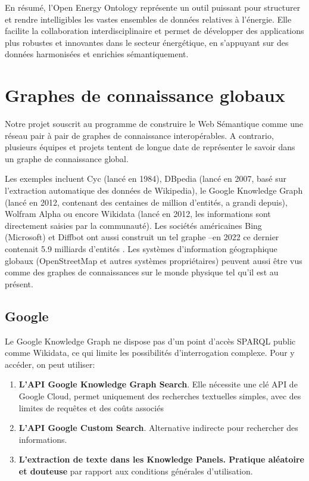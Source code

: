\documentclass[a4paper,11pt]{report}
\providecommand{\tightlist}{\setlength{\itemsep}{0pt}\setlength{\parskip}{0pt}}
\begin{document}
En résumé, l'Open Energy Ontology représente un outil puissant pour structurer et rendre intelligibles les vastes ensembles de données relatives à l'énergie. Elle facilite la collaboration interdisciplinaire et permet de développer des applications plus robustes et innovantes dans le secteur énergétique, en s'appuyant sur des données harmonisées et enrichies sémantiquement.

\section{Graphes de connaissance globaux}\label{graphes-de-connaissance-globaux}

Notre projet souscrit au programme de construire le Web Sémantique comme une réseau pair à pair de graphes de connaissance interopérables. A contrario, plusieurs équipes et projets tentent de longue date de représenter le savoir dans un graphe de connaissance global.

Les exemples incluent Cyc (lancé en 1984), DBpedia (lancé en 2007, basé sur l'extraction automatique des données de Wikipedia), le Google Knowledge Graph (lancé en 2012, contenant des centaines de million d'entités, a grandi depuis), Wolfram Alpha ou encore Wikidata (lancé en 2012, les informations sont directement saisies par la communauté). Les sociétés américaines Bing (Microsoft) et Diffbot ont aussi construit un tel graphe --en 2022 ce dernier contenait 5.9 milliards d'entités \citep{U6PVXXZP}. Les systèmes d'information géographique globaux (OpenStreetMap et autres systèmes propriétaires) peuvent aussi être vus comme des graphes de connaissances sur le monde physique tel qu'il est au présent.

\subsection{Google}\label{google}

Le Google Knowledge Graph ne dispose pas d'un point d'accès SPARQL public comme Wikidata, ce qui limite les possibilités d'interrogation complexe. Pour y accéder, on peut utiliser:

\begin{enumerate}
\def\labelenumi{\arabic{enumi}.}
\tightlist
\item
  \textbf{L'API Google Knowledge Graph Search}. Elle nécessite une clé API de Google Cloud, permet uniquement des recherches textuelles simples, avec des limites de requêtes et des coûts associés
\item
  \textbf{L'API Google Custom Search}. Alternative indirecte pour rechercher des informations.
\item
  \textbf{L'extraction de \textbf{texte dans les Knowledge Panel}s. \textbf{Pratique aléatoire et douteuse }}par rapport aux conditions générales d'utilisation.
\end{enumerate}
\end{document}
